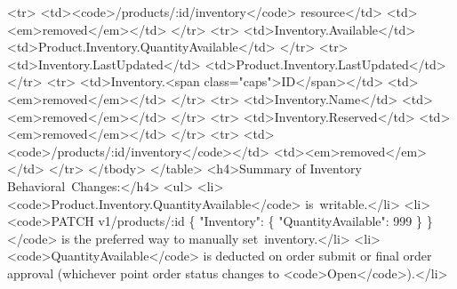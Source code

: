 \documentclass{memoir}%
\begin{document}
<tr>\newline%
<td><code>/products/:id/inventory</code> resource</td>\newline%
<td><em>removed</em></td>\newline%
</tr>\newline%
<tr>\newline%
<td>Inventory.Available</td>\newline%
<td>Product.Inventory.QuantityAvailable</td>\newline%
</tr>\newline%
<tr>\newline%
<td>Inventory.LastUpdated</td>\newline%
<td>Product.Inventory.LastUpdated</td>\newline%
</tr>\newline%
<tr>\newline%
<td>Inventory.<span class="caps">ID</span></td>\newline%
<td><em>removed</em></td>\newline%
</tr>\newline%
<tr>\newline%
<td>Inventory.Name</td>\newline%
<td><em>removed</em></td>\newline%
</tr>\newline%
<tr>\newline%
<td>Inventory.Reserved</td>\newline%
<td><em>removed</em></td>\newline%
</tr>\newline%
<tr>\newline%
<td><code>/products/:id/inventory</code></td>\newline%
<td><em>removed</em></td>\newline%
</tr>\newline%
</tbody>\newline%
</table>\newline%
<h4>Summary of Inventory Behavioral~Changes:</h4>\newline%
<ul>\newline%
<li><code>Product.Inventory.QuantityAvailable</code> is~writable.</li>\newline%
<li><code>PATCH v1/products/:id \{ "Inventory": \{ "QuantityAvailable": 999 \} \}</code> is the preferred way to manually set~inventory.</li>\newline%
<li><code>QuantityAvailable</code> is deducted on order submit or final order approval (whichever point order status changes to <code>Open</code>).</li>\newline%
\end{document}
